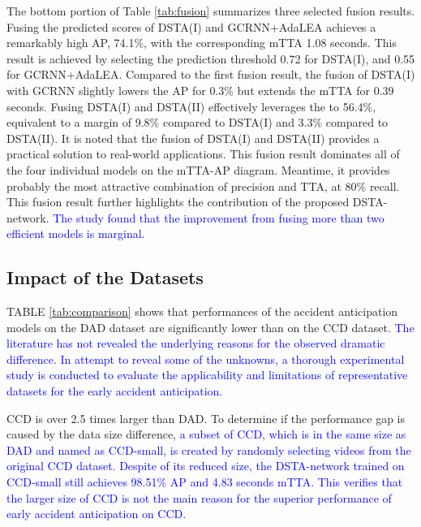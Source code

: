 \documentclass[journal]{IEEEtran}
\begin{document}
The bottom portion of Table \ref{tab:fusion} summarizes three selected fusion results. Fusing the predicted scores of DSTA(I) and GCRNN+AdaLEA achieves a remarkably high AP, 74.1\%, with the corresponding mTTA 1.08 seconds. This result is achieved by selecting the prediction threshold 0.72 for DSTA(I), and 0.55 for GCRNN+AdaLEA. Compared to the first fusion result, the fusion of DSTA(I) with GCRNN slightly lowers the AP for 0.3\% but extends the mTTA for 0.39 seconds. Fusing DSTA(I) and DSTA(II) effectively leverages the  to 56.4\%, equivalent to a margin of 9.8\% compared to DSTA(I) and 3.3\% compared to DSTA(II). It is noted that the fusion of DSTA(I) and DSTA(II) provides a practical solution to real-world applications. This fusion result dominates all of the four individual models on the mTTA-AP diagram. Meantime, it provides probably the most attractive combination of precision and TTA, at 80\% recall. This fusion result further highlights the contribution of the proposed DSTA-network. \textcolor{blue}{The study found that the improvement from fusing more than two efficient models is marginal.}


\subsection{Impact of the Datasets}
TABLE \ref{tab:comparison} shows that performances of the accident anticipation models on the DAD dataset are significantly lower than on the CCD dataset. \textcolor{blue}{The literature has not revealed the underlying reasons for the observed dramatic difference. In attempt to reveal some of the unknowns, a thorough experimental study is conducted to evaluate the applicability and limitations of representative datasets for the early accident anticipation.} 

CCD is over 2.5 times larger than DAD. To determine if the performance gap is caused by the data size difference, \textcolor{blue}{a subset of CCD, which is in the same size as DAD and named as CCD-small, is created by randomly selecting videos from the original CCD dataset. Despite of its reduced size, the DSTA-network trained on CCD-small still achieves 98.51\% AP and 4.83 seconds mTTA. This verifies that the larger size of CCD is not the main reason for the superior performance of early accident anticipation on CCD.} 
\end{document}
